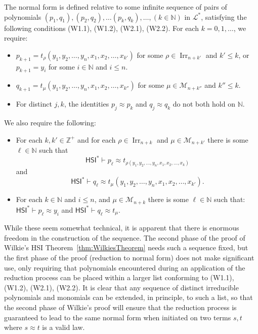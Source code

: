\documentclass[eqnor,reqno]{amsart}
\theoremstyle{plain}
\theoremstyle{definition}
\newcommand{\Irr}{\operatorname{Irr}}
\newcommand{\HSI}{\textsf{HSI}}
\begin{document}
The normal form is defined relative to some infinite sequence of pairs of polynomials $(p_1,q_1),(p_2,q_2), \dots (p_k,q_k), \dots, (k\in \mathbb{N})$ in  $\mathscr{L}^*$, satisfying the following conditions (W1.1), (W1.2), (W2.1), (W2.2).
For each $k=0,1,\dots$, we require:
\begin{itemize}
\item[(W1.1)] $p_{k+1}= t_{\rho}( y_1, y_2, \dots , y_n, x_1, x_2, \dots , x_{k'})$ for some $\rho\in \Irr_{n+k'}$ and $k'\leq k$, or $p_{k+1}=y_i$ for some $i\in \mathbb{N}$ and $i\leq n$.
\item[(W1.2)] $q_{k+1}= t_{\mu}( y_1, y_2, \dots , y_n, x_1, x_2, \dots , x_{k''})$ 
for some $\mu \in \mathcal{M}_{n+k''}$ and $k''\leq k$.
\item[(W1.3)] For distinct $j,k$, the identities $p_j\approx p_k$ and $q_j\approx q_k$ do not both hold on $\mathbb{N}$.
\end{itemize}
We also require the following:
\begin{itemize}
\item[(W2.1)] For each $k,k'\in \mathbb{Z^+}$ and for each $\rho\in \Irr_{n+k}$ and $\mu \in \mathcal{M}_{n+k'}$ there is some $\ell\in \mathbb{N}$ such that 
\[
\HSI^* \vdash p_\ell\approx  t_{\rho( y_1, y_2, \dots , y_n, x_1, x_2, \dots , x_k)}
\] 
and 
\[
\HSI^* \vdash q_\ell\approx t_{\mu}( y_1, y_2, \dots , y_n, x_1, x_2, \dots , x_{k'}).
\]
\item[(W2.2)] For each $k\in \mathbb{N}$ and $i\leq n$, and $\mu\in \mathcal{M}_{n+k}$ there is some $\ell\in \mathbb{N}$ such that: $\HSI^* \vdash p_\ell\approx y_i$ and $\HSI^*\vdash q_\ell \approx t_\mu$.
\end{itemize}
While these seem somewhat technical, it is apparent that there is enormous freedom in the construction of the sequence.  The second phase of the proof of Wilkie's HSI Theorem~\ref{thm:WilkiesTheorem} needs such a sequence fixed, but the first phase of the proof (reduction to normal form) does not make significant use, only requiring that polynomials encountered during an application of the reduction process can be placed within a larger list conforming to (W1.1), (W1.2), (W2.1), (W2.2).  It is clear that any sequence of distinct irreducible polynomials and monomials can be extended, in principle, to such a list, so that the second phase of Wilkie's proof will ensure that the reduction process is guaranteed to lead to the same normal form when initiated on two terms $s,t$ where $s\approx t$ is a valid law.
\end{document}
